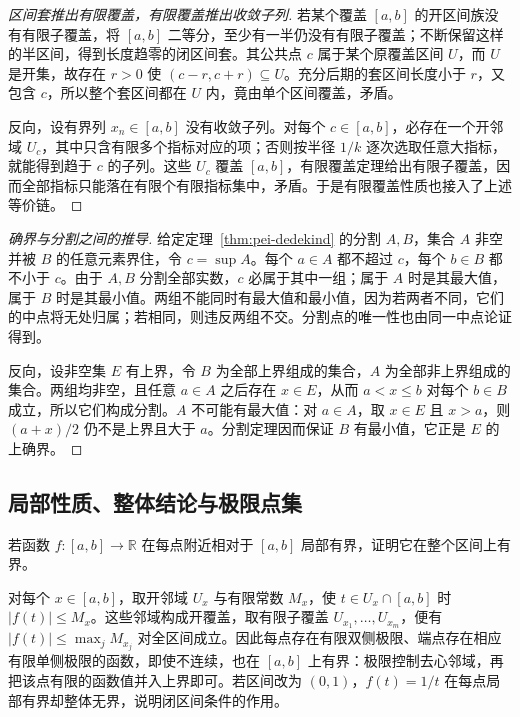 \begin{proof}[区间套推出有限覆盖，有限覆盖推出收敛子列]
若某个覆盖 $[a,b]$ 的开区间族没有有限子覆盖，将 $[a,b]$ 二等分，至少有一半仍没有有限子覆盖；不断保留这样的半区间，得到长度趋零的闭区间套。其公共点 $c$ 属于某个原覆盖区间 $U$，而 $U$ 是开集，故存在 $r>0$ 使 $(c-r,c+r)\subseteq U$。充分后期的套区间长度小于 $r$，又包含 $c$，所以整个套区间都在 $U$ 内，竟由单个区间覆盖，矛盾。

反向，设有界列 $x_n\in[a,b]$ 没有收敛子列。对每个 $c\in[a,b]$，必存在一个开邻域 $U_c$，其中只含有限多个指标对应的项；否则按半径 $1/k$ 逐次选取任意大指标，就能得到趋于 $c$ 的子列。这些 $U_c$ 覆盖 $[a,b]$，有限覆盖定理给出有限子覆盖，因而全部指标只能落在有限个有限指标集中，矛盾。于是有限覆盖性质也接入了上述等价链。
\end{proof}

\begin{proof}[确界与分割之间的推导]
给定定理~\ref{thm:pei-dedekind} 的分割 $A,B$，集合 $A$ 非空并被 $B$ 的任意元素界住，令 $c=\sup A$。每个 $a\in A$ 都不超过 $c$，每个 $b\in B$ 都不小于 $c$。由于 $A,B$ 分割全部实数，$c$ 必属于其中一组；属于 $A$ 时是其最大值，属于 $B$ 时是其最小值。两组不能同时有最大值和最小值，因为若两者不同，它们的中点将无处归属；若相同，则违反两组不交。分割点的唯一性也由同一中点论证得到。

反向，设非空集 $E$ 有上界，令 $B$ 为全部上界组成的集合，$A$ 为全部非上界组成的集合。两组均非空，且任意 $a\in A$ 之后存在 $x\in E$，从而 $a<x\le b$ 对每个 $b\in B$ 成立，所以它们构成分割。$A$ 不可能有最大值：对 $a\in A$，取 $x\in E$ 且 $x>a$，则 $(a+x)/2$ 仍不是上界且大于 $a$。分割定理因而保证 $B$ 有最小值，它正是 $E$ 的上确界。
\end{proof}

\subsection{局部性质、整体结论与极限点集}

\begin{example}
\label{ex:pei-local-boundedness-compact}
若函数 $f:[a,b]\to\mathbb{R}$ 在每点附近相对于 $[a,b]$ 局部有界，证明它在整个区间上有界。
\end{example}
\begin{solve}
对每个 $x\in[a,b]$，取开邻域 $U_x$ 与有限常数 $M_x$，使 $t\in U_x\cap[a,b]$ 时 $|f(t)|\le M_x$。这些邻域构成开覆盖，取有限子覆盖 $U_{x_1},\ldots,U_{x_m}$，便有 $|f(t)|\le\max_jM_{x_j}$ 对全区间成立。因此每点存在有限双侧极限、端点存在相应有限单侧极限的函数，即使不连续，也在 $[a,b]$ 上有界：极限控制去心邻域，再把该点有限的函数值并入上界即可。若区间改为 $(0,1)$，$f(t)=1/t$ 在每点局部有界却整体无界，说明闭区间条件的作用。
\end{solve}

